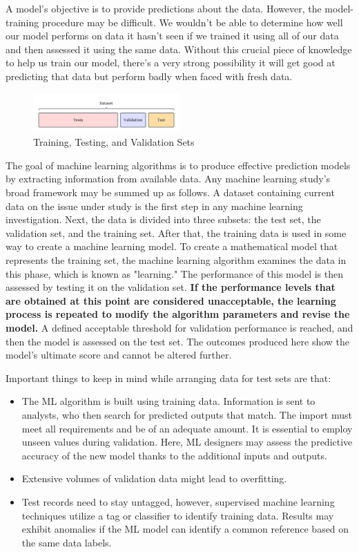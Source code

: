 A model's objective is to provide predictions about the data. However, the model-training procedure may be difficult. We wouldn't be able to determine how well our model performs on data it hasn't seen if we trained it using all of our data and then assessed it using the same data. Without this crucial piece of knowledge to help us train our model, there's a very strong possibility it will get good at predicting that data but perform badly when faced with fresh data.

\begin{figure}[h]
    \centering
    \includegraphics[width=0.5\textwidth]{images/train_test_val.png}
    \caption{Training, Testing, and Validation Sets}
    \end{figure}


The goal of machine learning algorithms is to produce effective prediction models by extracting information from available data. Any machine learning study's broad framework may be summed up as follows.
A dataset containing current data on the issue under study is the first step in any machine learning investigation. Next, the data is divided into three subsets: the test set, the validation set, and the training set. After that, the training data is used in some way to create a machine learning model. To create a mathematical model that represents the training set, the machine learning algorithm examines the data in this phase, which is known as "learning." The performance of this model is then assessed by testing it on the validation set.
\textbf{If the performance levels that are obtained at this point are considered unacceptable, the learning process is repeated to modify the algorithm parameters and revise the model.}
A defined acceptable threshold for validation performance is reached, and then the model is assessed on the test set. The outcomes produced here show the model's ultimate score and cannot be altered further. 

Important things to keep in mind while arranging data for test sets are that:
\begin {itemize}
\item The ML algorithm is built using training data. Information is sent to analysts, who then search for predicted outputs that match. The import must meet all requirements and be of an adequate amount. It is essential to employ unseen values during validation. Here, ML designers may assess the predictive accuracy of the new model thanks to the additional inputs and outputs.
\item Extensive volumes of validation data might lead to overfitting.
\item Test records need to stay untagged, however, supervised machine learning techniques utilize a tag or classifier to identify training data. Results may exhibit anomalies if the ML model can identify a common reference based on the same data labels.
\end{itemize}

